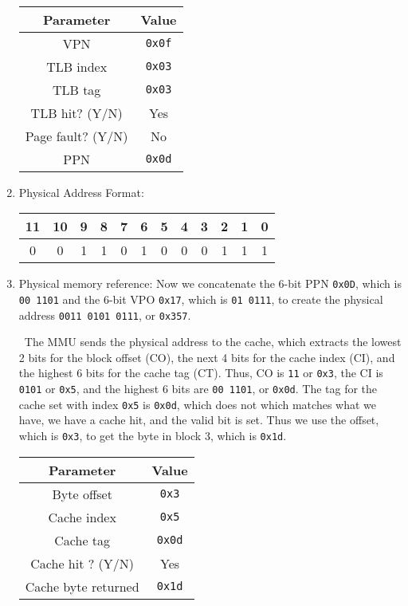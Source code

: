 \documentclass[12pt]{article}
\newenvironment{sol}[1][Solution]{\begin{trivlist}
		\item[\hskip \labelsep {\bfseries #1:}]}{\end{trivlist}}
\begin{document}
\begin{sol}
\begin{enumerate}[label=(\alph*)]
		\
		\begin{center}
			\begin{tabular}{cc}
				Parameter & Value\\
				\hline
				VPN & \texttt{0x0f} \\
				TLB index & \texttt{0x03} \\
				TLB tag & \texttt{0x03} \\
				TLB hit? (Y/N) & Yes\\
				Page fault? (Y/N) & No \\
				PPN & \texttt{0x0d}
			\end{tabular}
		\end{center}
		\item Physical Address Format:
				\begin{center}
			\begin{tabular}{|c|c|c|c|c|c|c|c|c|c|c|c|}
				11 & 10 & 9 & 8 & 7 & 6 & 5 & 4 & 3 & 2 & 1 & 0\\
				\hline
				0 & 0 & 1 & 1 & 0 & 1 & 0 & 0 & 0 & 1 & 1 & 1\\
				\hline
			\end{tabular}
		\end{center}
		\item Physical memory reference:
		Now we concatenate the 6-bit PPN \texttt{0x0D}, which is \texttt{00 1101} and the 6-bit VPO
		\texttt{0x17}, which is \texttt{01 0111}, to create the physical address \texttt{0011 0101 0111},
		or \texttt{0x357}.
		
		\
		The MMU sends the physical address to the cache, which extracts the lowest 2 bits for the
		block offset (CO), the next 4 bits for the cache index (CI), and the highest 6 bits
		for the cache tag (CT). Thus, CO is \texttt{11} or \texttt{0x3}, the CI is
		\texttt{0101} or \texttt{0x5}, and the highest 6 bits are \texttt{00 1101}, or \texttt{0x0d}.
		The tag for the cache set with index \texttt{0x5} is \texttt{0x0d}, which does not
		which matches what we have, we have a cache hit, and the valid bit is set. Thus we
		use the offset, which is \texttt{0x3}, to get the byte in block 3, which is \texttt{0x1d}.
			\begin{center}
				\begin{tabular}{cc}
					Parameter & Value\\
					\hline
					Byte offset & \texttt{0x3}\\
					Cache index & \texttt{0x5}\\
					Cache tag & \texttt{0x0d}\\
					Cache hit ? (Y/N) & Yes\\
					Cache byte returned & \texttt{0x1d}
				\end{tabular}
			\end{center}
	\end{enumerate}
\end{sol}
\end{document}
